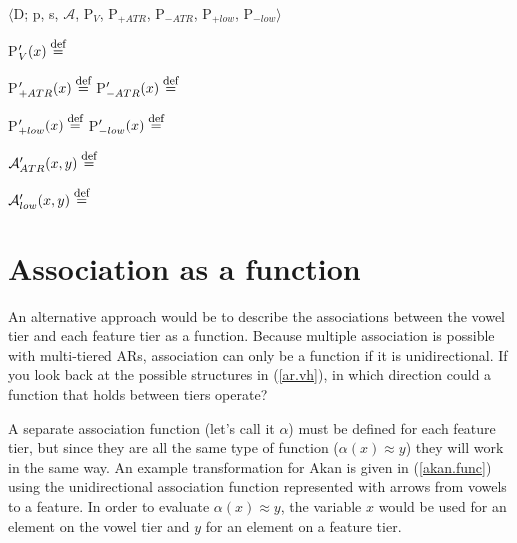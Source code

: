 \documentclass[,doc,floatsintext]{apa6}
\def\defeq{\mathrel{\buildrel \mbox{\footnotesize def} \over =}}
\theoremstyle{definition}
\theoremstyle{definition}
\theoremstyle{definition}
\theoremstyle{remark}
\begin{document}
\begin{exe}
\ex\label{qflfp.spread} $\langle$D; p, s, $\mathcal{A}$, P$_V$, P$_{+ATR}$, P$_{-ATR}$, P$_{+low}$, P$_{-low}\rangle$ 
\end{exe}

P\('_{V}(x) \defeq\)\vspace{0.5in}

P\('_{+ATR}(x) \defeq\) \hspace{2.25in}
P\('_{-ATR}(x) \defeq\)\vspace{0.5in}

P\('_{+low}(x) \defeq\) \hspace{2.25in}
P\('_{-low}(x) \defeq\)\vspace{0.5in}

\(\mathcal{A}_{ATR}'(x, y) \defeq\) \vspace{0.5in}

\(\mathcal{A}_{low}'(x, y) \defeq\)\vspace{0.5in}

\section{Association as a function}\label{association-as-a-function}

An alternative approach would be to describe the associations between
the vowel tier and each feature tier as a function. Because multiple
association is possible with multi-tiered ARs, association can only be a
function if it is unidirectional. If you look back at the possible
structures in (\ref{ar.vh}), in which direction could a function that
holds between tiers operate?

A separate association function (let's call it \(\alpha\)) must be
defined for each feature tier, but since they are all the same type of
function (\(\alpha(x)\approx y\)) they will work in the same way. An
example transformation for Akan is given in (\ref{akan.func}) using the
unidirectional association function represented with arrows from vowels
to a feature. In order to evaluate \(\alpha(x)\approx y\), the variable
\(x\) would be used for an element on the vowel tier and \(y\) for an
element on a feature tier.
\end{document}
